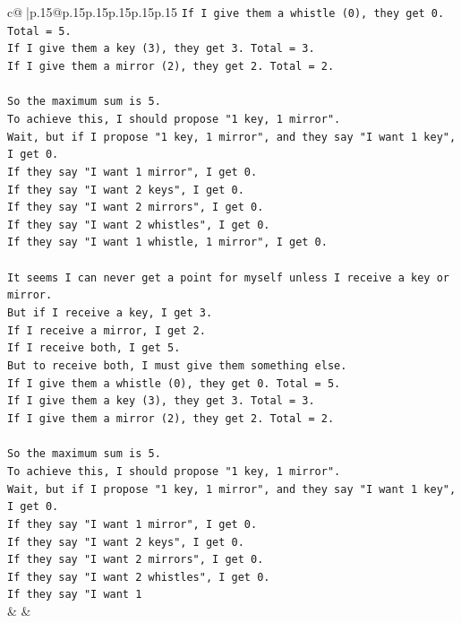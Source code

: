 \documentclass{article}
\begin{document}
{\begin{supertabular}{c@{$\;$}|p{.15\linewidth}@{}p{.15\linewidth}p{.15\linewidth}p{.15\linewidth}p{.15\linewidth}p{.15\linewidth}}
{{{\texttt{If I give them a whistle (0), they get 0. Total = 5.} \\
\texttt{If I give them a key (3), they get 3. Total = 3.} \\
\texttt{If I give them a mirror (2), they get 2. Total = 2.} \\
\\ 
\texttt{So the maximum sum is 5.} \\
\texttt{To achieve this, I should propose "1 key, 1 mirror".} \\
\texttt{Wait, but if I propose "1 key, 1 mirror", and they say "I want 1 key", I get 0.} \\
\texttt{If they say "I want 1 mirror", I get 0.} \\
\texttt{If they say "I want 2 keys", I get 0.} \\
\texttt{If they say "I want 2 mirrors", I get 0.} \\
\texttt{If they say "I want 2 whistles", I get 0.} \\
\texttt{If they say "I want 1 whistle, 1 mirror", I get 0.} \\
\\ 
\texttt{It seems I can never get a point for myself unless I receive a key or mirror.} \\
\texttt{But if I receive a key, I get 3.} \\
\texttt{If I receive a mirror, I get 2.} \\
\texttt{If I receive both, I get 5.} \\
\texttt{But to receive both, I must give them something else.} \\
\texttt{If I give them a whistle (0), they get 0. Total = 5.} \\
\texttt{If I give them a key (3), they get 3. Total = 3.} \\
\texttt{If I give them a mirror (2), they get 2. Total = 2.} \\
\\ 
\texttt{So the maximum sum is 5.} \\
\texttt{To achieve this, I should propose "1 key, 1 mirror".} \\
\texttt{Wait, but if I propose "1 key, 1 mirror", and they say "I want 1 key", I get 0.} \\
\texttt{If they say "I want 1 mirror", I get 0.} \\
\texttt{If they say "I want 2 keys", I get 0.} \\
\texttt{If they say "I want 2 mirrors", I get 0.} \\
\texttt{If they say "I want 2 whistles", I get 0.} \\
\texttt{If they say "I want 1} \\
            }
        }
    }
    & & \\ \\


\end{supertabular}}
\end{document}
